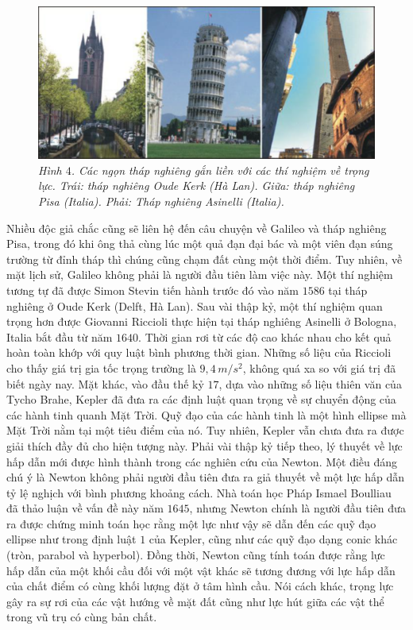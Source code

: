 \begin{multicols}{2}
	\begin{figure}[H]
		\vspace*{-5pt}
		\centering
		\captionsetup{labelformat= empty, justification=centering}
		\includegraphics[width =1\linewidth]{4}
		\caption{\small\textit{\color{timhieukhoahoc}Hình $4$. Các ngọn tháp nghiêng gắn liền với các thí nghiệm về trọng lực. Trái: tháp nghiêng Oude Kerk (Hà Lan). Giữa: tháp nghiêng Pisa (Italia). Phải: Tháp nghiêng Asinelli (Italia).}}
		\vspace*{-10pt}
	\end{figure}
	Nhiều độc giả chắc cũng sẽ liên hệ đến câu chuyện về Galileo và tháp nghiêng Pisa, trong đó khi ông thả cùng lúc một quả đạn đại bác và một viên đạn súng trường từ đỉnh tháp thì chúng cũng chạm đất cùng một thời điểm. Tuy nhiên, về mặt lịch sử, Galileo không phải là người đầu tiên làm việc này. Một thí nghiệm tương tự đã được Simon Stevin tiến hành trước đó vào năm $1586$ tại tháp nghiêng ở Oude Kerk (Delft, Hà Lan). Sau vài thập kỷ, một thí nghiệm quan trọng hơn được Giovanni Riccioli thực hiện tại tháp nghiêng Asinelli ở Bologna, Italia bắt đầu từ năm $1640$. Thời gian rơi từ các độ cao khác nhau cho kết quả hoàn toàn khớp với quy luật bình phương thời gian. Những số liệu của Riccioli cho thấy giá trị gia tốc trọng trường là $9{,}4 \,m/s^2$, không quá xa so với giá trị đã biết ngày nay. 
	\vskip 0.1cm
	Mặt khác, vào đầu thế kỷ $17$, dựa vào những số liệu thiên văn của Tycho Brahe, Kepler đã đưa ra các định luật quan trọng về sự chuyển động của các hành tinh quanh Mặt Trời. Quỹ đạo của các hành tinh là một hình ellipse mà Mặt Trời nằm tại một tiêu điểm của nó. Tuy nhiên, Kepler vẫn chưa đưa ra được giải thích đầy đủ cho hiện tượng này. Phải vài thập kỷ tiếp theo, lý thuyết về lực hấp dẫn mới được hình thành trong các nghiên cứu của Newton. Một điều đáng chú ý là Newton không phải người đầu tiên đưa ra giả thuyết về một lực hấp dẫn tỷ lệ nghịch với bình phương khoảng cách. Nhà toán học Pháp Ismael Boulliau đã thảo luận về vấn đề này năm $1645$, nhưng Newton chính là người đầu tiên đưa ra được chứng minh toán học rằng một lực như vậy sẽ dẫn đến các quỹ đạo ellipse như trong định luật $1$ của Kepler, cũng như các quỹ đạo dạng conic khác (tròn, parabol và hyperbol). Đồng thời, Newton cũng tính toán được rằng lực hấp dẫn của một khối cầu đối với một vật khác sẽ tương đương với lực hấp dẫn của chất điểm có cùng khối lượng đặt ở tâm hình cầu. Nói cách khác, trọng lực gây ra sự rơi của các vật hướng về mặt đất cũng như lực hút giữa các vật thể trong vũ trụ có cùng bản chất.

\end{multicols}
